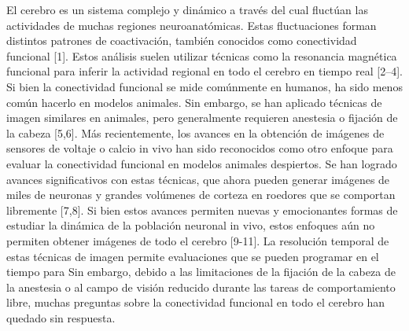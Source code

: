 El cerebro es un sistema complejo y dinámico a través del cual fluctúan las actividades de muchas regiones neuroanatómicas. Estas fluctuaciones forman distintos patrones de coactivación, también conocidos como conectividad funcional [1]. Estos análisis suelen utilizar técnicas como la resonancia magnética funcional para inferir la actividad regional en todo el cerebro en tiempo real [2–4]. Si bien la conectividad funcional se mide comúnmente en humanos, ha sido menos común hacerlo en modelos animales. Sin embargo, se han aplicado técnicas de imagen similares en animales, pero generalmente requieren anestesia o fijación de la cabeza [5,6]. Más recientemente, los avances en la obtención de imágenes de sensores de voltaje o calcio in vivo han sido reconocidos como otro enfoque para evaluar la conectividad funcional en modelos animales despiertos. Se han logrado avances significativos con estas técnicas, que ahora pueden generar imágenes de miles de neuronas y grandes volúmenes de corteza en roedores que se comportan libremente [7,8]. Si bien estos avances permiten nuevas y emocionantes formas de estudiar la dinámica de la población neuronal in vivo, estos enfoques aún no permiten obtener imágenes de todo el cerebro [9-11]. La resolución temporal de estas técnicas de imagen permite evaluaciones que se pueden programar en el tiempo para Sin embargo, debido a las limitaciones de la fijación de la cabeza de la anestesia o al campo de visión reducido durante las tareas de comportamiento libre, muchas preguntas sobre la conectividad funcional en todo el cerebro han quedado sin respuesta.


